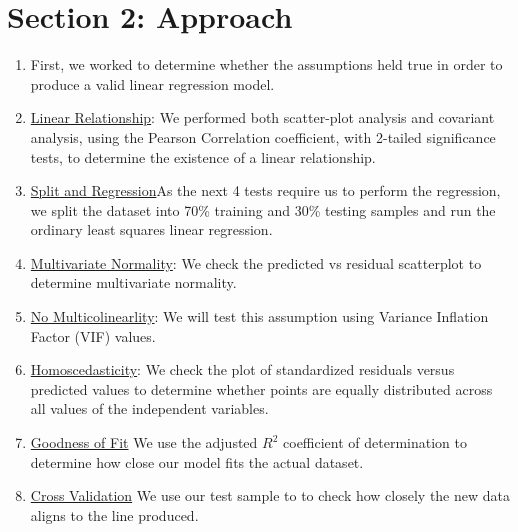 \documentclass[font=10pt]{article}
\begin{document}
  \section{Section 2: Approach}
 \begin{enumerate}
	\item   First, we worked to determine whether the assumptions held true in order to produce a valid linear regression model.
        \item \underline{Linear Relationship}: We performed both scatter-plot analysis and covariant analysis, using the Pearson Correlation coefficient, with 2-tailed significance tests, to determine the existence of a linear relationship.
	\item \underline {Split and Regression}As the next 4 tests require us to perform the regression, we split the dataset into 70\% training and 30\% testing samples and run the ordinary least squares linear regression.
	 \item \underline{Multivariate Normality}: We check the predicted vs residual scatterplot to determine multivariate normality.
	 \item \underline{No Multicolinearlity}: We will test this assumption using Variance Inflation Factor (VIF) values.
	\item \underline{Homoscedasticity}: We check the plot of standardized residuals versus predicted values to determine whether points are equally distributed across all values of the independent variables.
	\item \underline{Goodness of Fit} We use the adjusted $R^{2}$ coefficient of determination to determine how close our model fits the actual dataset.
	\item \underline{Cross Validation} We use our test sample to to check how closely the new data aligns to the line produced.
      \end{enumerate}
\end{document}
